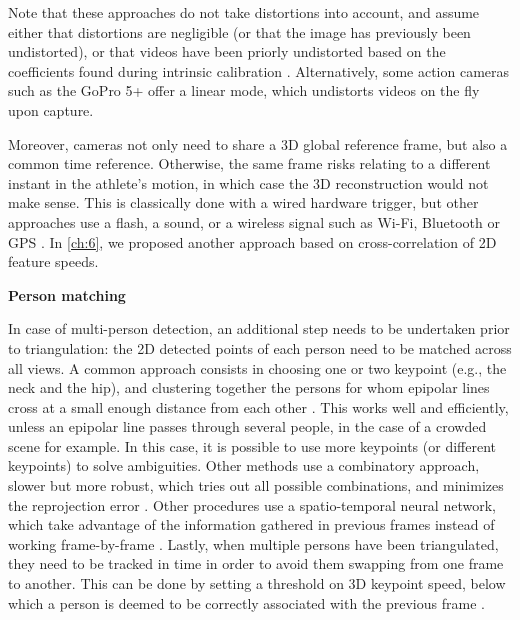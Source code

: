 Note that these approaches do not take distortions into account, and assume either that distortions are negligible (or that the image has previously been undistorted), or that videos have been priorly undistorted based on the coefficients found during intrinsic calibration \cite{Jackson2016}. Alternatively, some action cameras such as the GoPro 5+ offer a linear mode, which undistorts videos on the fly upon capture. 

Moreover, cameras not only need to share a 3D global reference frame, but also a common time reference. Otherwise, the same frame risks relating to a different instant in the athlete's motion, in which case the 3D reconstruction would not make sense. This is classically done with a wired hardware trigger, but other approaches use a flash, a sound, or a wireless signal such as Wi-Fi, Bluetooth or GPS \cite{GoPro2022}. In \autoref{ch:6}, we proposed another approach based on cross-correlation of 2D feature speeds.

\newpage
\noindent\textbf{Person matching}  

In case of multi-person detection, an additional step needs to be undertaken prior to triangulation: the 2D detected points of each person need to be matched across all views. A common approach consists in choosing one or two keypoint (e.g., the neck and the hip), and clustering together the persons for whom epipolar lines cross at a small enough distance from each other \cite{Dong2019,Slembrouck2020,Kadkhodamohammadi2021}. This works well and efficiently, unless an epipolar line passes through several people, in the case of a crowded scene for example. In this case, it is possible to use more keypoints (or different keypoints) to solve ambiguities. Other methods use a combinatory approach, slower but more robust, which tries out all possible combinations, and minimizes the reprojection error \cite{Bridgeman2019,Chen2020c,Pagnon2021}. Other procedures use a spatio-temporal neural network, which take advantage of the information gathered in previous frames instead of working frame-by-frame \cite{Raaj2019}. Lastly, when multiple persons have been triangulated, they need to be tracked in time in order to avoid them swapping from one frame to another. This can be done by setting a threshold on 3D keypoint speed, below which a person is deemed to be correctly associated with the previous frame \cite{Bridgeman2019}.



